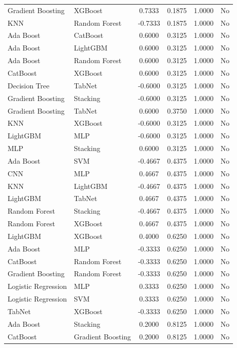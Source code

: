 \documentclass[a4paper,fleqn]{cas-sc}
\begin{document}
\begin{longtable}{l l c c c c}
Gradient Boosting & XGBoost & 0.7333 & 0.1875 & 1.0000 & No \\
KNN & Random Forest & -0.7333 & 0.1875 & 1.0000 & No \\
Ada Boost & CatBoost & 0.6000 & 0.3125 & 1.0000 & No \\
Ada Boost & LightGBM & 0.6000 & 0.3125 & 1.0000 & No \\
Ada Boost & Random Forest & 0.6000 & 0.3125 & 1.0000 & No \\
CatBoost & XGBoost & 0.6000 & 0.3125 & 1.0000 & No \\
Decision Tree & TabNet & -0.6000 & 0.3125 & 1.0000 & No \\
Gradient Boosting & Stacking & -0.6000 & 0.3125 & 1.0000 & No \\
Gradient Boosting & TabNet & 0.6000 & 0.3750 & 1.0000 & No \\
KNN & XGBoost & -0.6000 & 0.3125 & 1.0000 & No \\
LightGBM & MLP & -0.6000 & 0.3125 & 1.0000 & No \\
MLP & Stacking & 0.6000 & 0.3125 & 1.0000 & No \\
Ada Boost & SVM & -0.4667 & 0.4375 & 1.0000 & No \\
CNN & MLP & 0.4667 & 0.4375 & 1.0000 & No \\
KNN & LightGBM & -0.4667 & 0.4375 & 1.0000 & No \\
LightGBM & TabNet & 0.4667 & 0.4375 & 1.0000 & No \\
Random Forest & Stacking & -0.4667 & 0.4375 & 1.0000 & No \\
Random Forest & XGBoost & 0.4667 & 0.4375 & 1.0000 & No \\
LightGBM & XGBoost & 0.4000 & 0.6250 & 1.0000 & No \\
Ada Boost & MLP & -0.3333 & 0.6250 & 1.0000 & No \\
CatBoost & Random Forest & -0.3333 & 0.6250 & 1.0000 & No \\
Gradient Boosting & Random Forest & -0.3333 & 0.6250 & 1.0000 & No \\
Logistic Regression & MLP & 0.3333 & 0.6250 & 1.0000 & No \\
Logistic Regression & SVM & 0.3333 & 0.6250 & 1.0000 & No \\
TabNet & XGBoost & -0.3333 & 0.6250 & 1.0000 & No \\
Ada Boost & Stacking & 0.2000 & 0.8125 & 1.0000 & No \\
CatBoost & Gradient Boosting & 0.2000 & 0.8125 & 1.0000 & No \\

\end{longtable}
\end{document}
